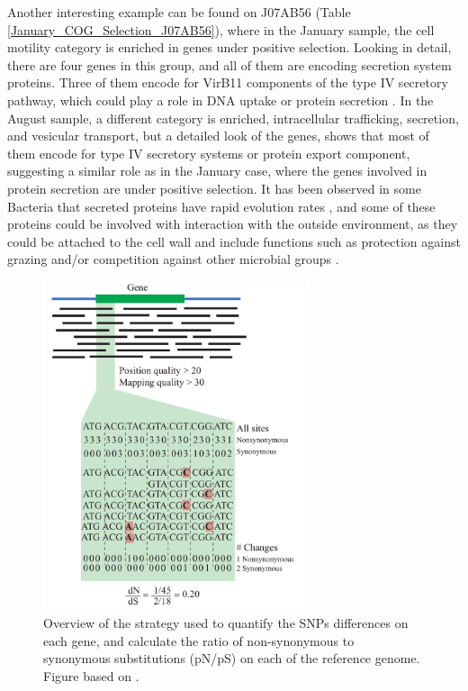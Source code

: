 Another interesting example can be found on J07AB56 (Table \ref{January_COG_Selection_J07AB56}), where in the January sample, the cell motility category is enriched in genes under positive selection. Looking in detail, there are four genes in this group, and all of them are encoding secretion system proteins. Three of them encode for VirB11 components of the type IV secretory pathway, which could play a role in DNA uptake or protein secretion \cite{Chandran:2009fg}. In the August sample, a different category is enriched, intracellular trafficking, secretion, and vesicular transport, but a detailed look of the genes, shows that most of them encode for type IV secretory systems or protein export component, suggesting a similar role as in the January case, where the genes involved in protein secretion are under positive selection. It has been observed in some Bacteria that secreted proteins have rapid evolution rates \cite{Nogueira:2012gv}, and some of these proteins could be involved with interaction with the outside environment, as they could be attached to the cell wall and include functions such as protection against grazing \cite{Matz:2005ik} and/or competition against other microbial groups \cite{Kirkup:2004hj}.


\begin{figure}[!hbtp]
  \centering
  \includegraphics[width=0.7\textwidth]{Chapter5/Figures/MappingStrategy.pdf}
  \caption{Overview of the strategy used to quantify the SNPs differences on each gene, and calculate the ratio of non-synonymous to synonymous substitutions (pN/pS) on each of the reference genome. Figure based on \cite{Tai:2011jo}.}
  \label{MappingStrategy}
\end{figure}

